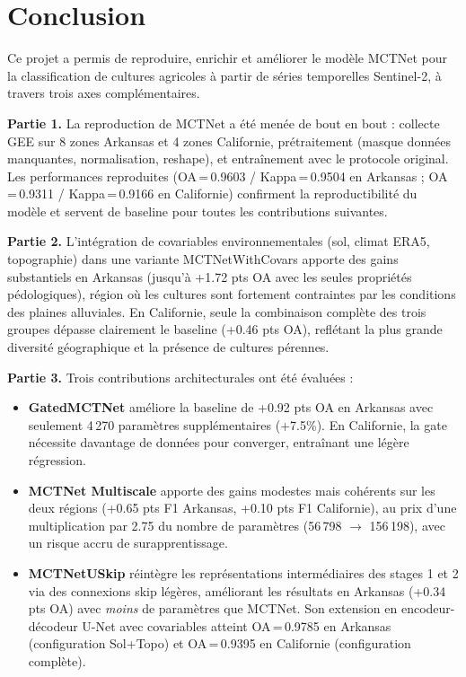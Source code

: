 
\chapter*{Conclusion}

Ce projet a permis de reproduire, enrichir et améliorer le modèle MCTNet pour
la classification de cultures agricoles à partir de séries temporelles Sentinel-2,
à travers trois axes complémentaires.

\textbf{Partie 1.}
La reproduction de MCTNet a été menée de bout en bout : collecte GEE sur 8 zones
Arkansas et 4 zones Californie, prétraitement (masque données manquantes, normalisation,
reshape), et entraînement avec le protocole original. Les performances reproduites
(OA\,=\,0.9603 / Kappa\,=\,0.9504 en Arkansas ; OA\,=\,0.9311 / Kappa\,=\,0.9166
en Californie) confirment la reproductibilité du modèle et servent de baseline
pour toutes les contributions suivantes.

\textbf{Partie 2.}
L'intégration de covariables environnementales (sol, climat ERA5, topographie)
dans une variante MCTNetWithCovars apporte des gains substantiels en Arkansas
(jusqu'à +1.72 pts OA avec les seules propriétés pédologiques), région où les
cultures sont fortement contraintes par les conditions des plaines alluviales.
En Californie, seule la combinaison complète des trois groupes dépasse clairement
le baseline (+0.46 pts OA), reflétant la plus grande diversité géographique
et la présence de cultures pérennes.

\textbf{Partie 3.}
Trois contributions architecturales ont été évaluées :
\begin{itemize}
  \item \textbf{GatedMCTNet} améliore la baseline de +0.92 pts OA en Arkansas
        avec seulement 4\,270 paramètres supplémentaires (+7.5\%). En Californie,
        la gate nécessite davantage de données pour converger, entraînant une
        légère régression.
  \item \textbf{MCTNet Multiscale} apporte des gains modestes mais cohérents
        sur les deux régions (+0.65 pts F1 Arkansas, +0.10 pts F1 Californie),
        au prix d'une multiplication par 2.75 du nombre de paramètres
        (56\,798 $\to$ 156\,198), avec un risque accru de surapprentissage.
  \item \textbf{MCTNetUSkip} réintègre les représentations intermédiaires des
        stages 1 et 2 via des connexions skip légères, améliorant les résultats
        en Arkansas (+0.34 pts OA) avec \emph{moins} de paramètres que MCTNet.
        Son extension en encodeur-décodeur U-Net avec covariables atteint
        OA\,=\,0.9785 en Arkansas (configuration Sol+Topo) et OA\,=\,0.9395
        en Californie (configuration complète).
\end{itemize}

